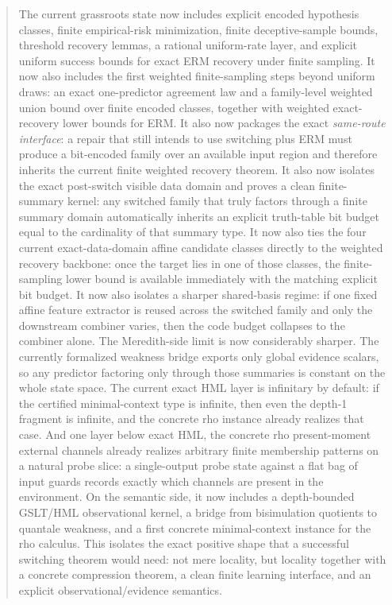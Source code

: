 \documentclass[11pt]{article}
\theoremstyle{remark}
\begin{document}
\begin{abstract}
The current grassroots state now includes explicit encoded hypothesis classes,
finite empirical-risk minimization, finite deceptive-sample bounds, threshold
recovery lemmas, a rational uniform-rate layer, and explicit uniform success
bounds for exact ERM recovery under finite sampling.  It now also includes the
first weighted finite-sampling steps beyond uniform draws: an exact
one-predictor agreement law and a family-level weighted union bound over finite
encoded classes, together with weighted exact-recovery lower bounds for ERM.
It also now packages the exact \emph{same-route interface}: a repair that still
intends to use switching plus ERM must produce a bit-encoded family over an
available input region and therefore inherits the current finite weighted
recovery theorem.
It also now isolates the exact post-switch visible data domain and proves a clean
finite-summary kernel: any switched family that truly factors through a finite
summary domain automatically inherits an explicit truth-table bit budget equal
to the cardinality of that summary type.
It now also ties the four current exact-data-domain affine candidate classes
directly to the weighted recovery backbone: once the target lies in one of
those classes, the finite-sampling lower bound is available immediately with the
matching explicit bit budget.
It now also isolates a sharper shared-basis regime: if one fixed affine feature
extractor is reused across the switched family and only the downstream combiner
varies, then the code budget collapses to the combiner alone.
The Meredith-side limit is now considerably sharper.  The currently formalized
weakness bridge exports only global evidence scalars, so any predictor factoring
only through those summaries is constant on the whole state space.  The current
exact HML layer is infinitary by default: if the certified minimal-context type
is infinite, then even the depth-1 fragment is infinite, and the concrete rho
instance already realizes that case.  And one layer below exact HML, the
concrete rho present-moment external channels already realizes arbitrary finite
membership patterns on a natural probe slice: a single-output probe state
against a flat bag of input guards records exactly which channels are present in
the environment.
On the semantic side, it now includes a depth-bounded GSLT/HML observational
kernel, a bridge from bisimulation quotients to quantale weakness, and a first
concrete minimal-context instance for the rho calculus.  This isolates the exact
positive shape that a successful switching theorem would need: not mere
locality, but locality together with a concrete compression theorem, a clean
finite learning interface, and an explicit observational/evidence semantics.
\end{abstract}
\end{document}
